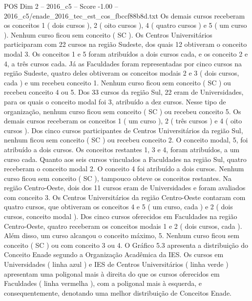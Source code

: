 \begin{textsample}{POS Dim 2 – 2016\_c5 – Score -1.00 – 2016\_c5/enade\_2016\_tec\_est\_cos\_fbccf88b8d.txt}
Os demais cursos receberam os conceitos 1 ( dois cursos ), 2 ( oito cursos ), 4 ( quatro cursos ) e 5 ( um curso ).
Nenhum curso ficou sem conceito ( SC ).
Os Centros Universitários participaram com 22 cursos na região Sudeste, dos quais 12 obtiveram o conceito modal 3.
Os conceitos 1 e 5 foram atribuídos a dois cursos cada, e os conceito 2 e 4, a três cursos cada.
Já as Faculdades foram representadas por cinco cursos na região Sudeste, quatro deles obtiveram os conceitos modais 2 e 3 ( dois cursos, cada ) e um recebeu conceito 1.
Nenhum curso ficou sem conceito ( SC ) ou recebeu conceito 4 ou 5.
Dos 33 cursos da região Sul, 22 eram de Universidades, para os quais o conceito modal foi 3, atribuído a dez cursos.
Nesse tipo de organização, nenhum curso ficou sem conceito ( SC ) ou recebeu conceito 5.
Os demais cursos receberam os conceitos 1 ( um curso ), 2 ( três cursos ) e 4 ( oito cursos ).
Dos cinco cursos participantes de Centros Universitários da região Sul, nenhum ficou sem conceito ( SC ) ou recebeu conceito 2.
O conceito modal, 5, foi atribuído a dois cursos.
Os conceitos restantes 1, 3 e 4, foram atribuídos, a um curso cada.
Quanto aos seis cursos vinculados a Faculdades na região Sul, quatro receberam o conceito modal 2.
O conceito 4 foi atribuído a dois cursos.
Nenhum curso ficou sem conceito ( SC ), tampouco obteve os conceitos restantes.
Na região Centro-Oeste, dois dos 11 cursos eram de Universidades e foram avaliados com conceito 3.
Os Centros Universitários da região Centro-Oeste contaram com quatro cursos, que obtiveram os conceitos 4 e 5 ( um curso, cada ) e 2 ( dois cursos, conceito modal ).
Dos cinco cursos oferecidos em Faculdades na região Centro-Oeste, quatro receberam os conceitos modais 1 e 2 ( dois cursos, cada ).
Além disso, um curso alcançou o conceito máximo, 5.
Nenhum curso ficou sem conceito ( SC ) ou com conceito 3 ou 4.
O Gráfico 5.3 apresenta a distribuição do Conceito Enade segundo a Organização Acadêmica da IES.
Os cursos em Universidades ( linha azul ) e IES de Centros Universitários ( linha verde ) apresentam uma poligonal mais à direita do que os cursos oferecidos em Faculdades ( linha vermelha ), com a poligonal mais à esquerda, e consequentemente, denotando uma melhor distribuição de Conceitos Enade.

\end{textsample}
